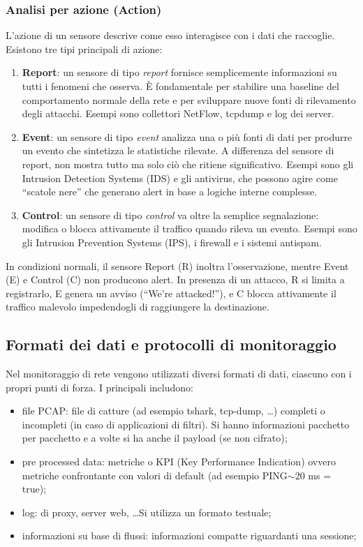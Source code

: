 \subsubsection{Analisi per azione (Action)}

L'azione di un sensore descrive come esso interagisce con i dati che raccoglie.
Esistono tre tipi principali di azione:

\begin{enumerate}
\item \textbf{Report}: un sensore di tipo \textit{report} fornisce semplicemente
informazioni su tutti i fenomeni che osserva. È fondamentale per stabilire una
baseline del comportamento normale della rete e per sviluppare nuove fonti di
rilevamento degli attacchi. Esempi sono collettori NetFlow, tcpdump e
log dei server.
\item \textbf{Event}: un sensore di tipo \textit{event} analizza una o più
fonti di dati per produrre un evento che sintetizza le statistiche rilevate.
A differenza del sensore di report, non mostra tutto ma solo ciò che ritiene
significativo. Esempi sono gli Intrusion Detection Systems (IDS) e gli
antivirus, che possono agire come ``scatole nere'' che generano alert in base
a logiche interne complesse.
\item \textbf{Control}: un sensore di tipo \textit{control} va oltre la semplice
segnalazione: modifica o blocca attivamente il traffico quando rileva un evento.
Esempi sono gli Intrusion Prevention Systems (IPS), i firewall e i sistemi
antispam.
\end{enumerate}

In condizioni normali, il sensore Report (R) inoltra l'osservazione, mentre
Event (E) e Control (C) non producono alert. In presenza di un attacco, R
si limita a registrarlo, E genera un avviso (``We're attacked!''), e C blocca
attivamente il traffico malevolo impedendogli di raggiungere la destinazione.

\subsection{Formati dei dati e protocolli di monitoraggio}

Nel monitoraggio di rete vengono utilizzati diversi formati di dati, ciascuno
con i propri punti di forza. I principali includono:
\begin{itemize}
\item file PCAP: file di catture (ad esempio tshark, tcp-dump, \ldots) completi o
incompleti (in caso di applicazioni di filtri). Si hanno informazioni pacchetto
per pacchetto e a volte si ha anche il payload (se non cifrato);
\item pre processed data: metriche o KPI (Key Performance Indication) ovvero
metriche confrontante con valori di default (ad esempio PING$\sim$20 ms =
true);
\item log: di proxy, server web, \ldots Si utilizza un formato testuale;
\item informazioni su base di flussi: informazioni compatte riguardanti una
sessione;
\end{itemize}

